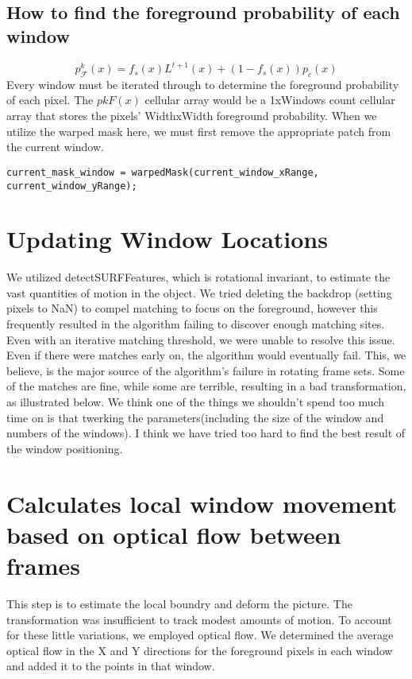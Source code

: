 \documentclass[15pt]{article}
\begin{document}
\subsection{How to find the foreground probability of each window}
\begin{equation}
p_{\mathcal{F}}^{k}(x)=f_{s}(x) L^{t+1}(x)+\left(1-f_{s}(x)\right) p_{c}(x)
\end{equation}
Every window must be iterated through to determine the foreground probability of each pixel. The $pkF(x)$ cellular array would be a 1xWindows count cellular array that stores the pixels' WidthxWidth foreground probability. When we utilize the warped mask here, we must first remove the appropriate patch from the current window.
\begin{lstlisting}
current_mask_window = warpedMask(current_window_xRange, current_window_yRange);
\end{lstlisting}


\section{Updating Window Locations}
We utilized detectSURFFeatures, which is rotational invariant, to estimate the vast quantities of motion in the object. We tried deleting the backdrop (setting pixels to NaN) to compel matching to focus on the foreground, however this frequently resulted in the algorithm failing to discover enough matching sites. Even with an iterative matching threshold, we were unable to resolve this issue. Even if there were matches early on, the algorithm would eventually fail. This, we believe, is the major source of the algorithm's failure in rotating frame sets. Some of the matches are fine, while some are terrible, resulting in a bad transformation, as illustrated below. We think one of the things we shouldn't spend too much time on is that twerking the parameters(including the size of the window and numbers of the windows). I think we have tried too hard to find the best result of the window positioning. 

\section{Calculates local window movement based on optical flow between frames}
This step is to estimate the local boundry and deform the picture. The transformation was insufficient to track modest amounts of motion. To account for these little variations, we employed optical flow. We determined the average optical flow in the X and Y directions for the foreground pixels in each window and added it to the points in that window.
\end{document}
